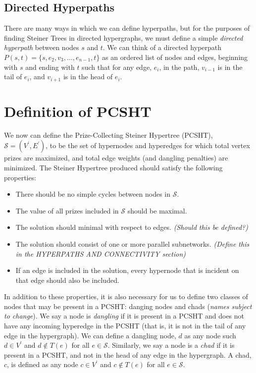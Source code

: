 \documentclass[12pt,twoside]{reedthesis}
\theoremstyle{definition}
\begin{document}
\subsection{Directed Hyperpaths}

There are many ways in which we can define hyperpaths, but for the purposes of finding Steiner Trees in directed hypergraphs, we must define a simple \textit{directed hyperpath} between nodes $s$ and $t$. We can think of a directed hyperpath $P(s,t)=\{s,e_2,v_3,...,e_{n-1},t\}$ as an ordered list of nodes and edges, beginning with $s$ and ending with $t$ such that for any edge, $e_i$, in the path, $v_{i-1}$ is in the tail of $e_i$, and $v_{i+1}$ is in the head of $e_i$.\par

\section{Definition of PCSHT}

We now can define the Prize-Collecting Steiner Hypertree (PCSHT), $\mathcal{S} = (V^\prime,E^\prime)$, to be the set of hypernodes and hyperedges for which total vertex prizes are maximized, and total edge weights (and dangling penalties) are minimized.  The Steiner Hypertree produced should satisfy the following properties:

\begin{itemize}
  \item{There should be no simple cycles between nodes in $\mathcal{S}$.}
  \item{The value of all prizes included in $\mathcal{S}$ should be maximal.}
  \item{The solution should minimal with respect to edges. \textit{(Should this be defined?)}}
  \item{The solution should consist of one or more parallel subnetworks. \textit{(Define this in the HYPERPATHS AND CONNECTIVITY section)}}
  \item{If an edge is included in the solution, every hypernode that is incident on that edge should also be included.}
\end{itemize}

In addition to these properties, it is also necessary for us to define two classes of nodes that may be present in a PCSHT: danging nodes and chads (\textit{names subject to change}).  We say a node is \textit{dangling} if it is present in a PCSHT and does not have any incoming hyperedge in the PCSHT (that is, it is not in the tail of any edge in the hypergraph). We can define a dangling node, $d$ as any node such $d \in V^\prime$ and $d \notin T(e)$ for all $e \in \mathcal{S}$. Similarly, we say a node is a \textit{chad} if it is present in a PCSHT, and not in the head of any edge in the hypergraph. A chad, $c$, is defined as any node $c \in V^\prime$ and $c \notin T(e)$ for all $e \in \mathcal{S}$.\par
\end{document}
